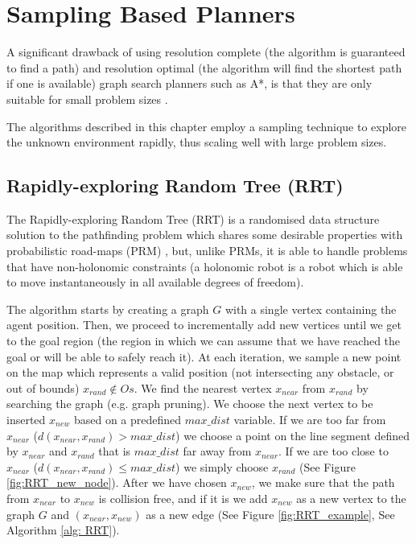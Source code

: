 \section{Sampling Based Planners} \label{B. Sampling based planners}
A significant drawback of using resolution complete (the algorithm is guaranteed to find a path) and resolution optimal (the algorithm will find the shortest path if one is available) graph search planners such as A*, is that they are only suitable for small problem sizes \cite{gammell2014informed}.

The algorithms described in this chapter employ a sampling technique to explore the unknown environment rapidly, thus scaling well with large problem sizes.

\subsection{Rapidly-exploring Random Tree (RRT)} \label{sec: RRT}
The Rapidly-exploring Random Tree (RRT) \cite{lavalle1998rapidly, rodriguez2006obstacle, lavalle2001randomized, karaman2011sampling} is a randomised data structure solution to the pathfinding problem which shares some desirable properties with probabilistic road-maps (PRM) \cite{choset2005principles}, but, unlike PRMs, it is able to handle problems that have non-holonomic constraints (a holonomic robot is a robot which is able to move instantaneously in all available degrees of freedom).

The algorithm starts by creating a graph $G$ with a single vertex containing the agent position. Then, we proceed to incrementally add new vertices until we get to the goal region (the region in which we can assume that we have reached the goal or will be able to safely reach it). At each iteration, we sample a new point on the map which represents a valid position (not intersecting any obstacle, or out of bounds) $x_{rand} \notin Os$. We find the nearest vertex $x_{near}$ from $x_{rand}$ by searching the graph (e.g. graph pruning). We choose the next vertex to be inserted $x_{new}$ based on a predefined $max\_dist$ variable. If we are too far from $x_{near}$ ($d(x_{near}, x_{rand}) > max\_dist$) we choose a point on the line segment defined by $x_{near}$ and $x_{rand}$ that is $max\_dist$ far away from $x_{near}$. If we are too close to $x_{near}$ ($d(x_{near}, x_{rand}) \leq max\_dist$) we simply choose $x_{rand}$ (See Figure \ref{fig:RRT_new_node}). After we have chosen $x_{new}$, we make sure that the path from $x_{near}$ to $x_{new}$ is collision free, and if it is we add $x_{new}$ as a new vertex to the graph $G$ and $(x_{near}, x_{new})$ as a new edge (See Figure \ref{fig:RRT_example}, See Algorithm \ref{alg: RRT}).

